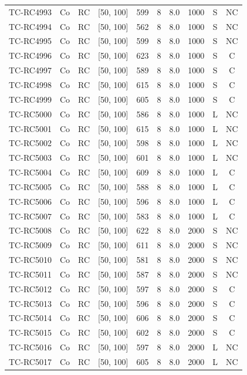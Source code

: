 \begin{longtable}{lccccccccc}
TC-RC4993 & Co & RC & [50, 100] & 599 & 8 & 8.0 & 1000 & S & NC \\
TC-RC4994 & Co & RC & [50, 100] & 562 & 8 & 8.0 & 1000 & S & NC \\
TC-RC4995 & Co & RC & [50, 100] & 599 & 8 & 8.0 & 1000 & S & NC \\
TC-RC4996 & Co & RC & [50, 100] & 623 & 8 & 8.0 & 1000 & S & C \\
TC-RC4997 & Co & RC & [50, 100] & 589 & 8 & 8.0 & 1000 & S & C \\
TC-RC4998 & Co & RC & [50, 100] & 615 & 8 & 8.0 & 1000 & S & C \\
TC-RC4999 & Co & RC & [50, 100] & 605 & 8 & 8.0 & 1000 & S & C \\
TC-RC5000 & Co & RC & [50, 100] & 586 & 8 & 8.0 & 1000 & L & NC \\
TC-RC5001 & Co & RC & [50, 100] & 615 & 8 & 8.0 & 1000 & L & NC \\
TC-RC5002 & Co & RC & [50, 100] & 598 & 8 & 8.0 & 1000 & L & NC \\
TC-RC5003 & Co & RC & [50, 100] & 601 & 8 & 8.0 & 1000 & L & NC \\
TC-RC5004 & Co & RC & [50, 100] & 609 & 8 & 8.0 & 1000 & L & C \\
TC-RC5005 & Co & RC & [50, 100] & 588 & 8 & 8.0 & 1000 & L & C \\
TC-RC5006 & Co & RC & [50, 100] & 596 & 8 & 8.0 & 1000 & L & C \\
TC-RC5007 & Co & RC & [50, 100] & 583 & 8 & 8.0 & 1000 & L & C \\
TC-RC5008 & Co & RC & [50, 100] & 622 & 8 & 8.0 & 2000 & S & NC \\
TC-RC5009 & Co & RC & [50, 100] & 611 & 8 & 8.0 & 2000 & S & NC \\
TC-RC5010 & Co & RC & [50, 100] & 581 & 8 & 8.0 & 2000 & S & NC \\
TC-RC5011 & Co & RC & [50, 100] & 587 & 8 & 8.0 & 2000 & S & NC \\
TC-RC5012 & Co & RC & [50, 100] & 597 & 8 & 8.0 & 2000 & S & C \\
TC-RC5013 & Co & RC & [50, 100] & 596 & 8 & 8.0 & 2000 & S & C \\
TC-RC5014 & Co & RC & [50, 100] & 606 & 8 & 8.0 & 2000 & S & C \\
TC-RC5015 & Co & RC & [50, 100] & 602 & 8 & 8.0 & 2000 & S & C \\
TC-RC5016 & Co & RC & [50, 100] & 597 & 8 & 8.0 & 2000 & L & NC \\
TC-RC5017 & Co & RC & [50, 100] & 605 & 8 & 8.0 & 2000 & L & NC \\

\end{longtable}
